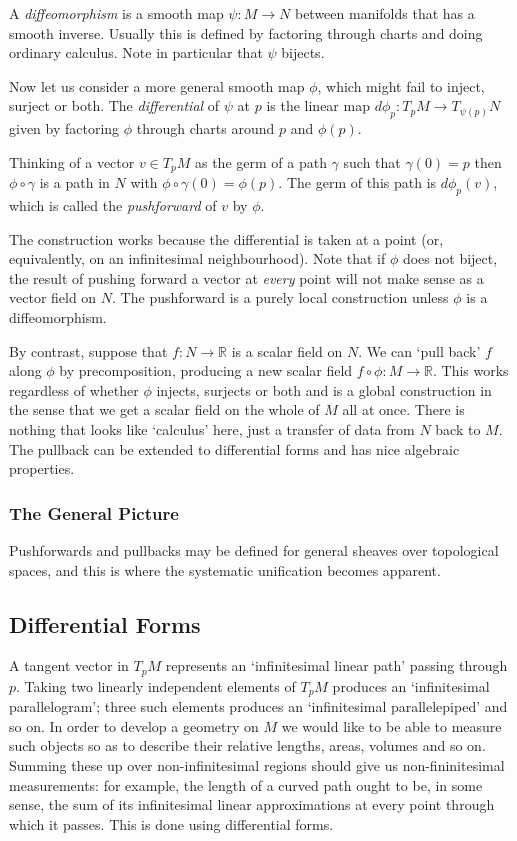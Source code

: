 \documentclass[oneside,english]{amsbook}
\numberwithin{section}{chapter}
\theoremstyle{plain}
\theoremstyle{definition}
\begin{document}
A \emph{diffeomorphism} is a smooth map $\psi:M\to N$ between manifolds that has a smooth inverse. Usually this is defined by factoring through charts and doing ordinary calculus. Note in particular that $\psi$ bijects.

Now let us consider a more general smooth map $\phi$, which might fail to inject, surject or both. The \emph{differential} of $\psi$ at $p$ is the linear map $d\phi_p:T_pM\to T_{\psi(p)}N$ given by factoring $\phi$ through charts around $p$ and $\phi(p)$. 

Thinking of a vector $v\in T_pM$ as the germ of a path $\gamma$ such that $\gamma(0)=p$ then $\phi\circ\gamma$ is a path in $N$ with $\phi\circ\gamma(0)=\phi(p)$. The germ of this path is $d\phi_p(v)$, which is called the \emph{pushforward} of $v$ by $\phi$. 

The construction works because the differential is taken at a point (or, equivalently, on an infinitesimal neighbourhood). Note that if $\phi$ does not biject, the result of pushing forward a vector at \emph{every} point will not make sense as a vector field on $N$. The pushforward is a purely local construction unless $\phi$ is a diffeomorphism.

By contrast, suppose that $f:N\to\mathbb{R}$ is a scalar field on $N$. We can `pull back' $f$ along $\phi$ by precomposition, producing a new scalar field $f\circ\phi:M\to\mathbb{R}$. This works regardless of whether $\phi$ injects, surjects or both and is a global construction in the sense that we get a scalar field on the whole of $M$ all at once. There is nothing that looks like `calculus' here, just a transfer of data from $N$ back to $M$. The pullback can be extended to differential forms and has nice algebraic properties.

\subsubsection{The General Picture}

Pushforwards and pullbacks may be defined for general sheaves over topological spaces, and this is where the systematic unification becomes apparent.



\subsection{Differential Forms}

A tangent vector in $T_p M$ represents an `infinitesimal linear path' passing through $p$. Taking two linearly independent elements of $T_p M$ produces an `infinitesimal parallelogram'; three such elements produces an `infinitesimal parallelepiped' and so on. In order to develop a geometry on $M$ we would like to be able to measure such objects so as to describe their relative lengths, areas, volumes and so on. Summing these up over non-infinitesimal regions should give us non-fininitesimal measurements: for example, the length of a curved path ought to be, in some sense, the sum of its infinitesimal linear approximations at every point through which it passes. This is done using differential forms.
\end{document}
